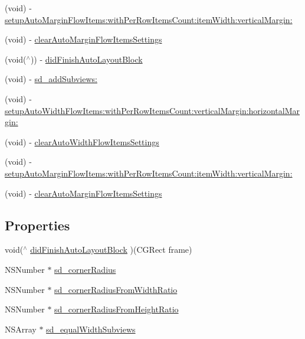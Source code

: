 \begin{DoxyCompactItemize}
\item 
(void) -\/ \mbox{\hyperlink{category_u_i_view_07_s_d_layout_extention_08_a57788eaf9c49da742925370164ba5702}{setup\+Auto\+Margin\+Flow\+Items\+:with\+Per\+Row\+Items\+Count\+:item\+Width\+:vertical\+Margin\+:}}
\item 
(void) -\/ \mbox{\hyperlink{category_u_i_view_07_s_d_layout_extention_08_adc46f9c2b4fafbd42548e94d25921ccf}{clear\+Auto\+Margin\+Flow\+Items\+Settings}}
\item 
(void($^\wedge$)) -\/ \mbox{\hyperlink{category_u_i_view_07_s_d_layout_extention_08_a331d5c017fd41aff38a84708524f857d}{did\+Finish\+Auto\+Layout\+Block}}
\item 
(void) -\/ \mbox{\hyperlink{category_u_i_view_07_s_d_layout_extention_08_a9da7e7a372beaee62a711b5b4d2ac914}{sd\+\_\+add\+Subviews\+:}}
\item 
(void) -\/ \mbox{\hyperlink{category_u_i_view_07_s_d_layout_extention_08_acf79adf5d8aee91802214b32de9bc6ec}{setup\+Auto\+Width\+Flow\+Items\+:with\+Per\+Row\+Items\+Count\+:vertical\+Margin\+:horizontal\+Margin\+:}}
\item 
(void) -\/ \mbox{\hyperlink{category_u_i_view_07_s_d_layout_extention_08_a888e0557fd4afaa936940bc459f1f500}{clear\+Auto\+Width\+Flow\+Items\+Settings}}
\item 
(void) -\/ \mbox{\hyperlink{category_u_i_view_07_s_d_layout_extention_08_a57788eaf9c49da742925370164ba5702}{setup\+Auto\+Margin\+Flow\+Items\+:with\+Per\+Row\+Items\+Count\+:item\+Width\+:vertical\+Margin\+:}}
\item 
(void) -\/ \mbox{\hyperlink{category_u_i_view_07_s_d_layout_extention_08_adc46f9c2b4fafbd42548e94d25921ccf}{clear\+Auto\+Margin\+Flow\+Items\+Settings}}
\end{DoxyCompactItemize}
\subsection*{Properties}
\begin{DoxyCompactItemize}
\item 
void($^\wedge$ \mbox{\hyperlink{category_u_i_view_07_s_d_layout_extention_08_a957b4b4a9f1e64ff40d9e055913b8421}{did\+Finish\+Auto\+Layout\+Block}} )(C\+G\+Rect frame)
\item 
N\+S\+Number $\ast$ \mbox{\hyperlink{category_u_i_view_07_s_d_layout_extention_08_ac753f3f534c613107cf0c321c59f4f77}{sd\+\_\+corner\+Radius}}
\item 
N\+S\+Number $\ast$ \mbox{\hyperlink{category_u_i_view_07_s_d_layout_extention_08_a27f4d6ce84b67bbb9942f447363aa89e}{sd\+\_\+corner\+Radius\+From\+Width\+Ratio}}
\item 
N\+S\+Number $\ast$ \mbox{\hyperlink{category_u_i_view_07_s_d_layout_extention_08_a88e83189effedbc4dea6358bec0955ff}{sd\+\_\+corner\+Radius\+From\+Height\+Ratio}}
\item 
N\+S\+Array $\ast$ \mbox{\hyperlink{category_u_i_view_07_s_d_layout_extention_08_a094535c423c19377bc59c9e96e866839}{sd\+\_\+equal\+Width\+Subviews}}
\end{DoxyCompactItemize}


